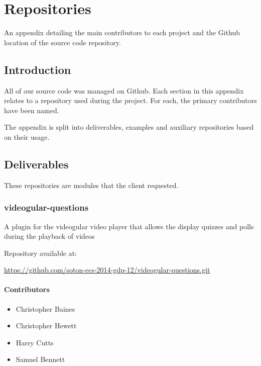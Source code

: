 \chapter{Repositories} \label{App:Repositories}

An appendix detailing the main contributors to each project and the Github location of the source code repository.

\begin{preamble}
\end{preamble}

\section{Introduction}

All of our source code was managed on Github. Each section in this appendix relates to a repository used during the project. For each, the primary contributors have been named.

The appendix is split into deliverables, examples and auxiliary repositories based on their usage.

\section{Deliverables}

These repositories are modules that the client requested.

\subsection{videogular-questions}
\label{Section:Repo_videogular_questions}

A plugin for the videogular video player that allows the display quizzes and polls during the playback of videos

Repository available at:

\url{https://github.com/soton-ecs-2014-gdp-12/videogular-questions.git}

\subsubsection{Contributors}
\begin{itemize}
  \item Christopher Baines
  \item Christopher Hewett
  \item Harry Cutts
  \item Samuel Bennett
\end{itemize}


